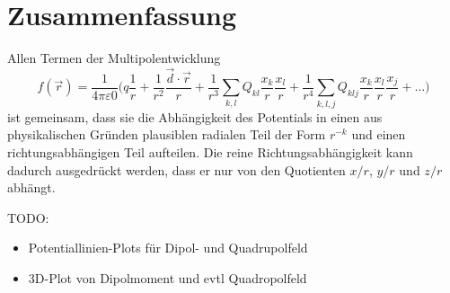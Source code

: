\section{Zusammenfassung}
Allen Termen der Multipolentwicklung
\[
f(\vec r)
=
\frac{1}{4\pi\varepsilon 0}
\biggl(
q
\frac{1}{r}
+
\frac{1}{r^2} \frac{\vec{d}\cdot\vec{r}}{r}
+
\frac{1}{r^3} \sum_{k,l}Q_{kl}\frac{x_k}{r}\frac{x_l}{r}
+
\frac{1}{r^4} \sum_{k,l,j}Q_{klj}\frac{x_k}{r}\frac{x_l}{r}\frac{x_j}{r}
+
\dots
\biggr)
\]
ist gemeinsam, dass sie die Abhängigkeit des Potentials in einen
aus physikalischen Gründen plausiblen radialen Teil der Form $r^{-k}$
und einen richtungsabhängigen Teil aufteilen.
Die reine Richtungsabhängigkeit kann dadurch ausgedrückt werden, dass
er nur von den Quotienten $x/r$, $y/r$ und $z/r$ abhängt.

TODO:
\begin{itemize}
\item Potentiallinien-Plots für Dipol- und Quadrupolfeld
\item 3D-Plot von Dipolmoment und evtl Quadropolfeld
\end{itemize}


